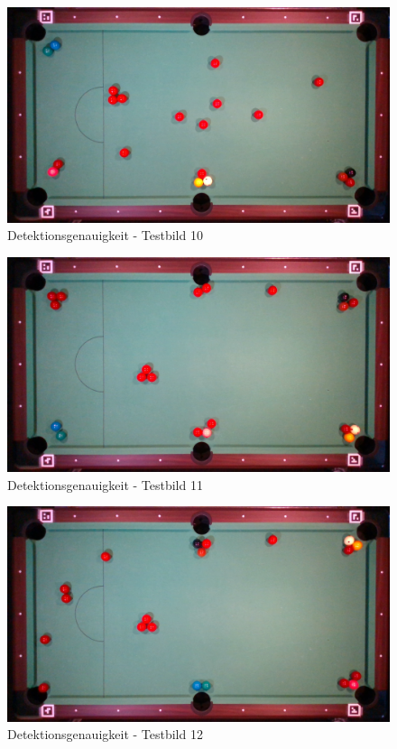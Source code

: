 \begin{figure}[h!]
    \begin{center}
        \includegraphics[width=0.8\linewidth]{../common/07_appendix/resources/00_detection/09_detektion_testbild_10.png}
    \end{center}
    \caption{Detektionsgenauigkeit - Testbild 10}
    \label{fig:detektionsgenauigkeit:testbild:10}
\end{figure}
\begin{figure}[h!]
    \begin{center}
        \includegraphics[width=0.8\linewidth]{../common/07_appendix/resources/00_detection/10_detektion_testbild_11.png}
    \end{center}
    \caption{Detektionsgenauigkeit - Testbild 11}
    \label{fig:detektionsgenauigkeit:testbild:11}
\end{figure}
\begin{figure}[h!]
    \begin{center}
        \includegraphics[width=0.8\linewidth]{../common/07_appendix/resources/00_detection/11_detektion_testbild_12.png}
    \end{center}
    \caption{Detektionsgenauigkeit - Testbild 12}
    \label{fig:detektionsgenauigkeit:testbild:12}
\end{figure}
